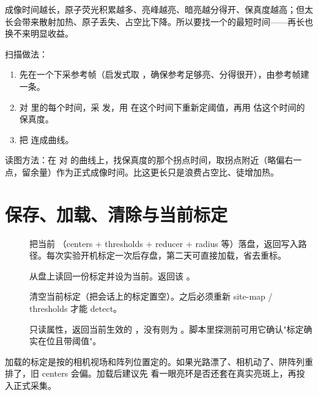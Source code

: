 \documentclass[11pt,oneside,openany]{book}
\begin{document}
成像时间越长，原子荧光积累越多、亮峰越亮、暗亮越分得开、保真度越高；但太长会带来散射加热、原子丢失、占空比下降。所以要找一个的最短时间——再长也换不来明显收益。

扫描做法：

\begin{enumerate}
\item 先在一个下采参考帧（启发式取 ，确保参考足够亮、分得很开），由参考帧建一条。
\item 对  里的每个时间，采  发，用  在这个时间下重新定阈值，再用  估这个时间的保真度。
\item 把  连成曲线。
\end{enumerate}

读图方法：在  对  的曲线上，找保真度的那个拐点时间，取拐点附近（略偏右一点，留余量）作为正式成像时间。比这更长只是浪费占空比、徒增加热。

\section{保存、加载、清除与当前标定}

\begin{description}
\item[] 把当前 （centers + thresholds + reducer + radius 等）落盘，返回写入路径。每次实验开机标定一次后存盘，第二天可直接加载，省去重标。
\item[] 从盘上读回一份标定并设为当前。返回该 。
\item[] 清空当前标定（把会话上的标定置空）。之后必须重新 site-map / thresholds 才能 detect。
\item[] 只读属性，返回当前生效的 ，没有则为 。脚本里探测前可用它确认"标定确实在位且带阈值"。
\end{description}

\begin{notebox}
加载的标定是按的相机视场和阵列位置定的。如果光路漂了、相机动了、阱阵列重排了，旧 centers 会偏。加载后建议先  看一眼亮环是否还套在真实亮斑上，再投入正式采集。
\end{notebox}
\end{document}
